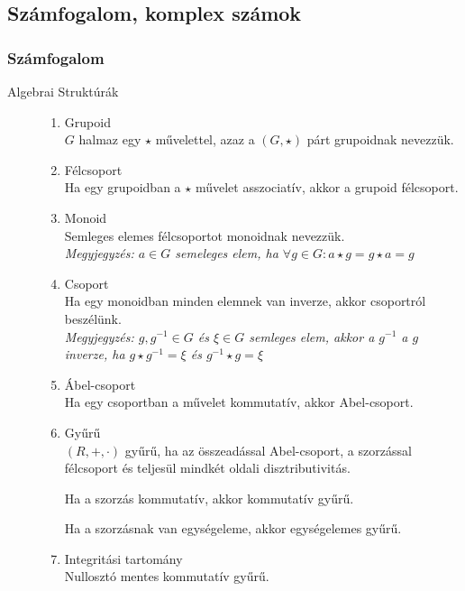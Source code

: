 \documentclass[margin=0px]{article}
\begin{document}
\subsection{Számfogalom, komplex számok}
\subsubsection{Számfogalom}
\begin{description}
    \item[Algebrai Struktúrák] \hfill
        \begin{enumerate}
            \item Grupoid \\
                  $G$ halmaz egy $\star$ művelettel, azaz a $(G, \star)$ párt grupoidnak nevezzük.
            \item Félcsoport\\
                  Ha egy grupoidban a $\star$ művelet asszociatív, akkor a grupoid félcsoport.
            \item Monoid \\
                  Semleges elemes félcsoportot monoidnak nevezzük.\\
                  \textit{Megyjegyzés: $ a \in G$ semeleges elem, ha $\forall g \in G : a \star g = g \star a = g$}
            \item Csoport \\
                  Ha egy monoidban minden elemnek van inverze, akkor csoportról beszélünk. \\
                  \textit{Megyjegyzés: $g,g^{-1} \in G$ és $\xi\in G$ semleges elem, akkor a $g^{-1}$ a $g$ inverze, ha $g\star g^{-1} = \xi$ és $g^{-1} \star g = \xi$}
            \item Ábel-csoport \\
                  Ha egy csoportban a művelet kommutatív, akkor Abel-csoport.
            \item Gyűrű \\
                  $(R,+,\cdot )$ gyűrű, ha az összeadással Abel-csoport, a szorzással félcsoport és teljesül mindkét oldali disztributivitás.

                  Ha a szorzás kommutatív, akkor kommutatív gyűrű.

                  Ha a szorzásnak van egységeleme, akkor egységelemes gyűrű.
            \item Integritási tartomány \\
                  Nullosztó mentes kommutatív gyűrű.


\end{enumerate}
\end{description}
\end{document}
